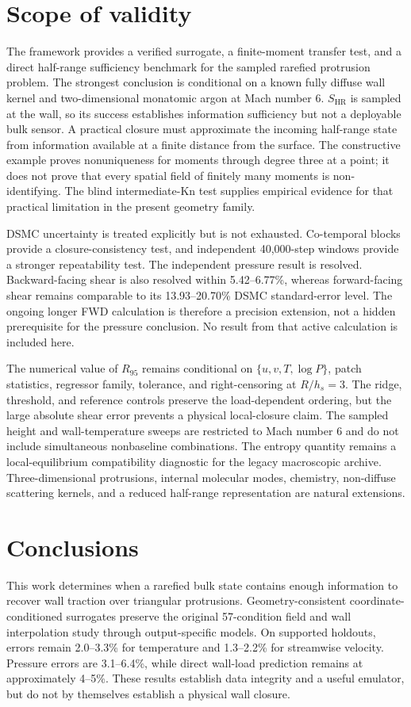 \documentclass[aip,pof,preprint,notitlepage,floatfix,amsmath,amssymb]{revtex4-2}
\newcommand{\Kn}{\mathrm{Kn}}
\begin{document}
\section{Scope of validity}
The framework provides a verified surrogate, a finite-moment transfer test, and a direct half-range sufficiency benchmark for the sampled rarefied protrusion problem. The strongest conclusion is conditional on a known fully diffuse wall kernel and two-dimensional monatomic argon at Mach number 6. $S_{\mathrm{HR}}$ is sampled at the wall, so its success establishes information sufficiency but not a deployable bulk sensor. A practical closure must approximate the incoming half-range state from information available at a finite distance from the surface. The constructive example proves nonuniqueness for moments through degree three at a point; it does not prove that every spatial field of finitely many moments is non-identifying. The blind intermediate-$\Kn$ test supplies empirical evidence for that practical limitation in the present geometry family.

DSMC uncertainty is treated explicitly but is not exhausted. Co-temporal blocks provide a closure-consistency test, and independent 40,000-step windows provide a stronger repeatability test. The independent pressure result is resolved. Backward-facing shear is also resolved within 5.42--6.77\%, whereas forward-facing shear remains comparable to its 13.93--20.70\% DSMC standard-error level. The ongoing longer FWD calculation is therefore a precision extension, not a hidden prerequisite for the pressure conclusion. No result from that active calculation is included here.

The numerical value of $R_{95}$ remains conditional on $\{u,v,T,\log P\}$, patch statistics, regressor family, tolerance, and right-censoring at $R/h_s=3$. The ridge, threshold, and reference controls preserve the load-dependent ordering, but the large absolute shear error prevents a physical local-closure claim. The sampled height and wall-temperature sweeps are restricted to Mach number 6 and do not include simultaneous nonbaseline combinations. The entropy quantity remains a local-equilibrium compatibility diagnostic for the legacy macroscopic archive. Three-dimensional protrusions, internal molecular modes, chemistry, non-diffuse scattering kernels, and a reduced half-range representation are natural extensions.

\section{Conclusions}
This work determines when a rarefied bulk state contains enough information to recover wall traction over triangular protrusions. Geometry-consistent coordinate-conditioned surrogates preserve the original 57-condition field and wall interpolation study through output-specific models. On supported holdouts, errors remain 2.0--3.3\% for temperature and 1.3--2.2\% for streamwise velocity. Pressure errors are 3.1--6.4\%, while direct wall-load prediction remains at approximately 4--5\%. These results establish data integrity and a useful emulator, but do not by themselves establish a physical wall closure.
\end{document}

